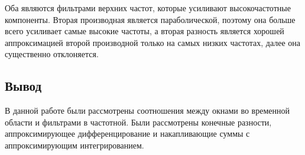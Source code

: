 Оба являются фильтрами верхних частот, которые усиливают высокочастотные компоненты. Вторая производная является параболической, поэтому она больше всего усиливает самые высокие частоты, а вторая разность является хорошей аппроксимацией второй производной только на самых низких частотах, далее она существенно отклоняется.


\subsection{Вывод}

В данной работе были рассмотрены соотношения между окнами во временной области и фильтрами в частотной. Были рассмотрены конечные разности, аппроксимирующее дифференцирование и накапливающие суммы с аппроксимирующим интегрированием.